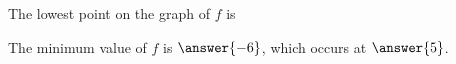 \documentclass{ximera}
\begin{document}
\begin{example}
\begin{question}

The lowest point on the graph of $f$ is


\begin{multipleChoice}
\end{multipleChoice}
\end{question}


\begin{question}
The minimum value of $f$ is $\answer{-6}$, which occurs at $\answer{5}$.
\end{question}







\end{example}
\end{document}
